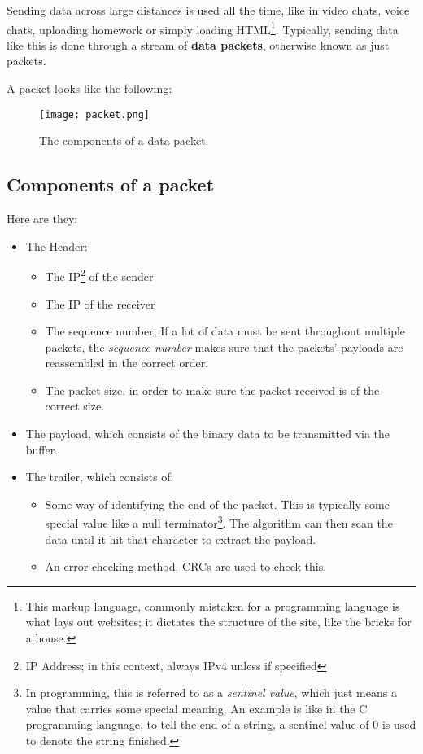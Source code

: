 \documentclass[../main.tex]{subfiles}
\begin{document}
Sending data across large distances is used all the time, like in video chats, voice chats, uploading homework or simply loading HTML\footnote{This markup language, commonly mistaken for a programming language is what lays out websites; it dictates the structure of the site, like the bricks for a house.}. Typically, sending data like this is done through a stream of \textbf{data packets}, otherwise known as just packets.

A packet looks like the following:

\begin{figure}[h]
    \centering
    \texttt{[image: packet.png]}
    \caption{The components of a data packet.}
    \label{fig:packet}
\end{figure}

\subsection{Components of a packet}

Here are they:

\begin{itemize}

\item The Header:
    \begin{itemize}
    \item The IP\footnote{IP Address; in this context, always IPv4 unless if specified} of the sender
    \item The IP of the receiver
    \item The sequence number; If a lot of data must be sent throughout multiple packets, the
          \emph{sequence number} makes sure that the packets' payloads are reassembled in the correct order.
    \item The packet size, in order to make sure the packet received is of the correct size.
    \end{itemize}

\item The payload, which consists of the binary data to be transmitted via the buffer.

\item The trailer, which consists of:
    \begin{itemize}
    \item Some way of identifying the end of the packet. This is typically some special value like a null terminator\footnote{In programming,
          this is referred to as a \emph{sentinel value}, which just means a value that carries some special meaning. An example is like in the
          C programming language, to tell the end of a string, a sentinel value of 0 is used to denote the string finished.}. The algorithm can
          then scan the data until it hit that character to extract the payload.
    \item An error checking method. CRCs are used to check this.
    \end{itemize}
\end{itemize}
\end{document}
